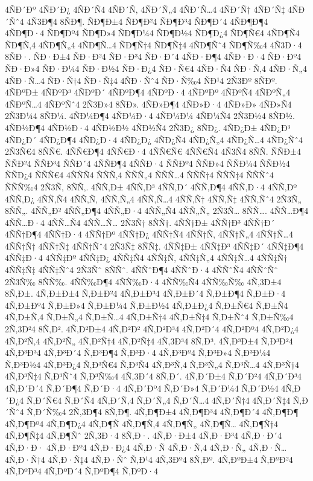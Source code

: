 {4ÑÐ´Ðº
4ÑÐ´Ð¿
4ÑÐ´Ñ4
4ÑÐ´Ñ‚
4ÑÐ´Ñ„4
4ÑÐ´Ñ…4
4ÑÐ´Ñ†
4ÑÐ´Ñ‡
4ÑÐ´Ñˆ4
4Ñ3Ð¶4
8ÑÐ¶.
ÑÐ¶Ð±4
ÑÐ¶Ð²4
ÑÐ¶Ð³4
ÑÐ¶Ð´4
4ÑÐ¶Ð¶4
4ÑÐ¶Ð·4
ÑÐ¶Ðº4
ÑÐ¶Ð»4
ÑÐ¶Ð¼4
ÑÐ¶Ð½4
ÑÐ¶Ð¿4
ÑÐ¶Ñ€4
4ÑÐ¶Ñ4
ÑÐ¶Ñ‚4
4ÑÐ¶Ñ„4
4ÑÐ¶Ñ…4
ÑÐ¶Ñ†4
ÑÐ¶Ñ‡4
4ÑÐ¶Ñˆ4
ÑÐ¶Ñ‰4
4Ñ3Ð·4
8ÑÐ·.
ÑÐ·Ð±4
ÑÐ·Ð²4
ÑÐ·Ð³4
ÑÐ·Ð´4
4ÑÐ·Ð¶4
4ÑÐ·Ð·4
ÑÐ·Ðº4
ÑÐ·Ð»4
ÑÐ·Ð¼4
ÑÐ·Ð½4
ÑÐ·Ð¿4
ÑÐ·Ñ€4
4ÑÐ·Ñ4
ÑÐ·Ñ‚4
4ÑÐ·Ñ„4
4ÑÐ·Ñ…4
ÑÐ·Ñ†4
ÑÐ·Ñ‡4
4ÑÐ·Ñˆ4
ÑÐ·Ñ‰4
ÑÐ¹4
2Ñ3Ðº
8ÑÐº.
4ÑÐºÐ±
4ÑÐºÐ³
4ÑÐºÐ´
4ÑÐºÐ¶4
4ÑÐºÐ·4
4ÑÐºÐº
4ÑÐºÑ4
4ÑÐºÑ„4
4ÑÐºÑ…4
4ÑÐºÑˆ4
2Ñ3Ð»4
8ÑÐ».
4ÑÐ»Ð¶4
4ÑÐ»Ð·4
4ÑÐ»Ð»
4ÑÐ»Ñ4
2Ñ3Ð¼4
8ÑÐ¼.
4ÑÐ¼Ð¶4
4ÑÐ¼Ð·4
4ÑÐ¼Ð¼
4ÑÐ¼Ñ4
2Ñ3Ð½4
8ÑÐ½.
4ÑÐ½Ð¶4
4ÑÐ½Ð·4
4ÑÐ½Ð½
4ÑÐ½Ñ4
2Ñ3Ð¿
8ÑÐ¿.
4ÑÐ¿Ð±
4ÑÐ¿Ð³
4ÑÐ¿Ð´
4ÑÐ¿Ð¶4
4ÑÐ¿Ð·4
4ÑÐ¿Ð¿
4ÑÐ¿Ñ4
4ÑÐ¿Ñ„4
4ÑÐ¿Ñ…4
4ÑÐ¿Ñˆ4
2Ñ3Ñ€4
8ÑÑ€.
4ÑÑ€Ð¶4
4ÑÑ€Ð·4
4ÑÑ€Ñ€
4ÑÑ€Ñ4
4Ñ3Ñ4
8ÑÑ.
ÑÑÐ±4
ÑÑÐ²4
ÑÑÐ³4
ÑÑÐ´4
4ÑÑÐ¶4
4ÑÑÐ·4
ÑÑÐº4
ÑÑÐ»4
ÑÑÐ¼4
ÑÑÐ½4
ÑÑÐ¿4
ÑÑÑ€4
4ÑÑÑ4
ÑÑÑ‚4
ÑÑÑ„4
ÑÑÑ…4
ÑÑÑ†4
ÑÑÑ‡4
ÑÑÑˆ4
ÑÑÑ‰4
2Ñ3Ñ‚
8ÑÑ‚.
4ÑÑ‚Ð±
4ÑÑ‚Ð³
4ÑÑ‚Ð´
4ÑÑ‚Ð¶4
4ÑÑ‚Ð·4
4ÑÑ‚Ðº
4ÑÑ‚Ð¿
4ÑÑ‚Ñ4
4ÑÑ‚Ñ‚
4ÑÑ‚Ñ„4
4ÑÑ‚Ñ…4
4ÑÑ‚Ñ†
4ÑÑ‚Ñ‡
4ÑÑ‚Ñˆ4
2Ñ3Ñ„
8ÑÑ„.
4ÑÑ„Ð²
4ÑÑ„Ð¶4
4ÑÑ„Ð·4
4ÑÑ„Ñ4
4ÑÑ„Ñ„
2Ñ3Ñ…
8ÑÑ….
4ÑÑ…Ð¶4
4ÑÑ…Ð·4
4ÑÑ…Ñ4
4ÑÑ…Ñ…
2Ñ3Ñ†
8ÑÑ†.
4ÑÑ†Ð±
4ÑÑ†Ð³
4ÑÑ†Ð´
4ÑÑ†Ð¶4
4ÑÑ†Ð·4
4ÑÑ†Ðº
4ÑÑ†Ð¿
4ÑÑ†Ñ4
4ÑÑ†Ñ‚
4ÑÑ†Ñ„4
4ÑÑ†Ñ…4
4ÑÑ†Ñ†
4ÑÑ†Ñ‡
4ÑÑ†Ñˆ4
2Ñ3Ñ‡
8ÑÑ‡.
4ÑÑ‡Ð±
4ÑÑ‡Ð³
4ÑÑ‡Ð´
4ÑÑ‡Ð¶4
4ÑÑ‡Ð·4
4ÑÑ‡Ðº
4ÑÑ‡Ð¿
4ÑÑ‡Ñ4
4ÑÑ‡Ñ‚
4ÑÑ‡Ñ„4
4ÑÑ‡Ñ…4
4ÑÑ‡Ñ†
4ÑÑ‡Ñ‡
4ÑÑ‡Ñˆ4
2Ñ3Ñˆ
8ÑÑˆ.
4ÑÑˆÐ¶4
4ÑÑˆÐ·4
4ÑÑˆÑ4
4ÑÑˆÑˆ
2Ñ3Ñ‰
8ÑÑ‰.
4ÑÑ‰Ð¶4
4ÑÑ‰Ð·4
4ÑÑ‰Ñ4
4ÑÑ‰Ñ‰
4Ñ‚3Ð±4
8Ñ‚Ð±.
4Ñ‚Ð±Ð±4
Ñ‚Ð±Ð²4
4Ñ‚Ð±Ð³4
4Ñ‚Ð±Ð´4
Ñ‚Ð±Ð¶4
Ñ‚Ð±Ð·4
4Ñ‚Ð±Ðº4
Ñ‚Ð±Ð»4
Ñ‚Ð±Ð¼4
Ñ‚Ð±Ð½4
4Ñ‚Ð±Ð¿4
Ñ‚Ð±Ñ€4
Ñ‚Ð±Ñ4
4Ñ‚Ð±Ñ‚4
Ñ‚Ð±Ñ„4
Ñ‚Ð±Ñ…4
4Ñ‚Ð±Ñ†4
4Ñ‚Ð±Ñ‡4
Ñ‚Ð±Ñˆ4
Ñ‚Ð±Ñ‰4
2Ñ‚3Ð²4
8Ñ‚Ð².
4Ñ‚Ð²Ð±4
4Ñ‚Ð²Ð²
4Ñ‚Ð²Ð³4
4Ñ‚Ð²Ð´4
4Ñ‚Ð²Ðº4
4Ñ‚Ð²Ð¿4
4Ñ‚Ð²Ñ‚4
4Ñ‚Ð²Ñ„
4Ñ‚Ð²Ñ†4
4Ñ‚Ð²Ñ‡4
4Ñ‚3Ð³4
8Ñ‚Ð³.
4Ñ‚Ð³Ð±4
Ñ‚Ð³Ð²4
4Ñ‚Ð³Ð³4
4Ñ‚Ð³Ð´4
Ñ‚Ð³Ð¶4
Ñ‚Ð³Ð·4
4Ñ‚Ð³Ðº4
Ñ‚Ð³Ð»4
Ñ‚Ð³Ð¼4
Ñ‚Ð³Ð½4
4Ñ‚Ð³Ð¿4
Ñ‚Ð³Ñ€4
Ñ‚Ð³Ñ4
4Ñ‚Ð³Ñ‚4
Ñ‚Ð³Ñ„4
Ñ‚Ð³Ñ…4
4Ñ‚Ð³Ñ†4
4Ñ‚Ð³Ñ‡4
Ñ‚Ð³Ñˆ4
Ñ‚Ð³Ñ‰4
4Ñ‚3Ð´4
8Ñ‚Ð´.
4Ñ‚Ð´Ð±4
Ñ‚Ð´Ð²4
4Ñ‚Ð´Ð³4
4Ñ‚Ð´Ð´4
Ñ‚Ð´Ð¶4
Ñ‚Ð´Ð·4
4Ñ‚Ð´Ðº4
Ñ‚Ð´Ð»4
Ñ‚Ð´Ð¼4
Ñ‚Ð´Ð½4
4Ñ‚Ð´Ð¿4
Ñ‚Ð´Ñ€4
Ñ‚Ð´Ñ4
4Ñ‚Ð´Ñ‚4
Ñ‚Ð´Ñ„4
Ñ‚Ð´Ñ…4
4Ñ‚Ð´Ñ†4
4Ñ‚Ð´Ñ‡4
Ñ‚Ð´Ñˆ4
Ñ‚Ð´Ñ‰4
2Ñ‚3Ð¶4
8Ñ‚Ð¶.
4Ñ‚Ð¶Ð±4
4Ñ‚Ð¶Ð³4
4Ñ‚Ð¶Ð´4
4Ñ‚Ð¶Ð¶
4Ñ‚Ð¶Ðº4
4Ñ‚Ð¶Ð¿4
4Ñ‚Ð¶Ñ
4Ñ‚Ð¶Ñ‚4
4Ñ‚Ð¶Ñ„
4Ñ‚Ð¶Ñ…
4Ñ‚Ð¶Ñ†4
4Ñ‚Ð¶Ñ‡4
4Ñ‚Ð¶Ñˆ
2Ñ‚3Ð·4
8Ñ‚Ð·.
4Ñ‚Ð·Ð±4
4Ñ‚Ð·Ð³4
4Ñ‚Ð·Ð´4
4Ñ‚Ð·Ð·
4Ñ‚Ð·Ðº4
4Ñ‚Ð·Ð¿4
4Ñ‚Ð·Ñ
4Ñ‚Ð·Ñ‚4
4Ñ‚Ð·Ñ„
4Ñ‚Ð·Ñ…
4Ñ‚Ð·Ñ†4
4Ñ‚Ð·Ñ‡4
4Ñ‚Ð·Ñˆ
Ñ‚Ð¹4
4Ñ‚3Ðº4
8Ñ‚Ðº.
4Ñ‚ÐºÐ±4
Ñ‚ÐºÐ²4
4Ñ‚ÐºÐ³4
4Ñ‚ÐºÐ´4
Ñ‚ÐºÐ¶4
Ñ‚ÐºÐ·4
}

